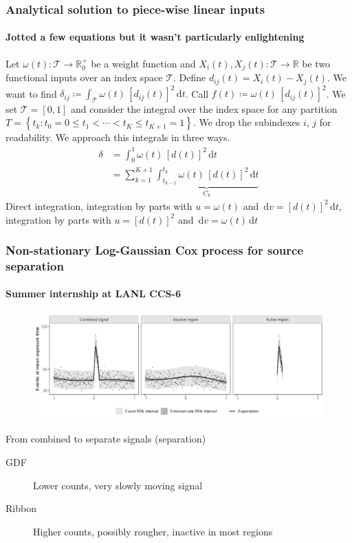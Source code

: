 \documentclass[handout]{snedecorbeamer}
\begin{document}
\begin{frame}
  \frametitle{Analytical solution to piece-wise linear inputs}
  \framesubtitle{Jotted a few equations but it wasn't particularly enlightening}

  \newcommand{\calT}{\mathcal{T}}
  \newcommand{\dt}{\, \mathrm{d}t}
  \newcommand{\du}{\, \mathrm{d}u}
  \newcommand{\dv}{\, \mathrm{d}v}
  \newcommand{\w}{\omega}
  \newcommand{\dotsq}{{\left[d(t)\right]}^2}
  \newcommand{\fall}{\,~\forall~\,}

  Let $\w(t): \calT \to \mathbb{R}_0^+$ be a weight function and
  $X_i(t), X_j(t): \calT \to \mathbb{R}$ be two functional inputs over
  an index space $\calT$.  Define $d_{ij}(t) = X_i(t) - X_j(t)$.  We
  want to find $ \delta_{ij} \coloneqq \int_{\calT} \w(t) \,
  {\left[d_{ij}(t)\right]}^2 \dt$. Call $f(t) \coloneqq \w(t) \,
  {\left[d_{ij}(t)\right]}^2$.  We set $\calT = [0, 1]$ and consider the
  integral over the index space for any partition $T = \left\{ t_k: t_0
    = 0 \le t_1 < \cdots < t_K \le t_{K+1} = 1 \right\}$.  We drop the
  subindexes $i$, $j$ for readability. We approach this integrals in
  three ways.
  \begin{align}
  \delta
  &=\int_0^1 \w(t) \, \dotsq \dt \label{eq:fnorm-direct} \\
  &=\sum_{k = 1}^{K + 1}
    \underbrace{
    \int_{t_{k-1}}^{t_k} \w(t) \, \dotsq
    \dt}_{C_k} \label{eq:fnorm-direct-pw}
  \end{align}
  Direct integration, integration by parts with $u = \w(t)$ and
  $\dv = \dotsq\dt$, integration by parts with $u = \dotsq$ and $\dv =\w(t)\dt$
\end{frame}

\begin{frame}
  \frametitle{Non-stationary Log-Gaussian Cox process for source separation}
  \framesubtitle{Summer internship at LANL CCS-6}
  \begin{figure}
    \centering
    \includegraphics[width=\textwidth]{inc/application-fit-separation3.pdf}%
  \end{figure}
  {\footnotesize
    From combined to separate signals (separation)
    \begin{description}
    \item[GDF] Lower counts, very slowly moving signal
    \item[Ribbon] Higher counts, possibly rougher, inactive in most regions
    \end{description}
  }
\end{frame}
\end{document}
